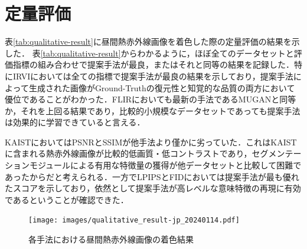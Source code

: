 \documentclass[11pt,dvipdfmx]{ujreport}
\begin{document}

\section{定量評価}
\label{sec:qualitative_result}
表\ref{tab:qualitative-result}に昼間熱赤外線画像を着色した際の定量評価の結果を示した．
表\ref{tab:qualitative-result}からわかるように，ほぼ全てのデータセットと評価指標の組み合わせで提案手法が最良，またはそれと同等の結果を記録した．特にIRVIにおいては全ての指標で提案手法が最良の結果を示しており，提案手法によって生成された画像がGround-Truthの復元性と知覚的な品質の両方において優位であることがわかった．FLIRにおいても最新の手法であるMUGANと同等か，それを上回る結果であり，比較的小規模なデータセットであっても提案手法は効果的に学習できていると言える．\par
KAISTにおいてはPSNRとSSIMが他手法より僅かに劣っていた．これはKAISTに含まれる熱赤外線画像が比較的低画質・低コントラストであり，セグメンテーションモジュールによる有用な特徴量の獲得が他データセットと比較して困難であったからだと考えられる．一方でLPIPSとFIDにおいては提案手法が最も優れたスコアを示しており，依然として提案手法が高レベルな意味特徴の再現に有効であるということが確認できた．

\begin{figure}[tb]
    \centering
    \texttt{[image: images/qualitative\_result-jp\_20240114.pdf]}
    \caption{各手法における昼間熱赤外線画像の着色結果}
    \label{fig:qualitative_measure}
\end{figure}
\end{document}
